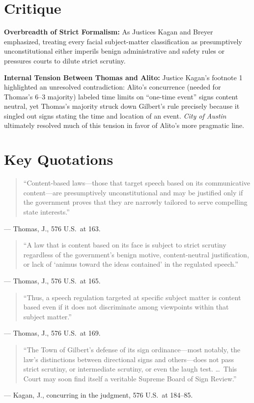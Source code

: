 \documentclass[12pt]{article}
\begin{document}
\section{Critique}
\textbf{Overbreadth of Strict Formalism:} As Justices Kagan and Breyer emphasized, treating every facial subject-matter classification as presumptively unconstitutional either imperils benign administrative and safety rules or pressures courts to dilute strict scrutiny.

\textbf{Internal Tension Between Thomas and Alito:} Justice Kagan's footnote 1 highlighted an unresolved contradiction: Alito's concurrence (needed for Thomas's 6--3 majority) labeled time limits on ``one-time event'' signs content neutral, yet Thomas's majority struck down Gilbert's rule precisely because it singled out signs stating the time and location of an event. \textit{City of Austin} ultimately resolved much of this tension in favor of Alito's more pragmatic line.

\section{Key Quotations}
\begin{quote}
``Content-based laws---those that target speech based on its communicative content---are presumptively unconstitutional and may be justified only if the government proves that they are narrowly tailored to serve compelling state interests.''
\end{quote}
\noindent --- Thomas, J., 576 U.S.\ at 163.

\begin{quote}
``A law that is content based on its face is subject to strict scrutiny regardless of the government's benign motive, content-neutral justification, or lack of `animus toward the ideas contained' in the regulated speech.''
\end{quote}
\noindent --- Thomas, J., 576 U.S.\ at 165.

\begin{quote}
``Thus, a speech regulation targeted at specific subject matter is content based even if it does not discriminate among viewpoints within that subject matter.''
\end{quote}
\noindent --- Thomas, J., 576 U.S.\ at 169.

\begin{quote}
``The Town of Gilbert's defense of its sign ordinance---most notably, the law's distinctions between directional signs and others---does not pass strict scrutiny, or intermediate scrutiny, or even the laugh test. \dots\ This Court may soon find itself a veritable Supreme Board of Sign Review.''
\end{quote}
\noindent --- Kagan, J., concurring in the judgment, 576 U.S.\ at 184--85.
\end{document}
